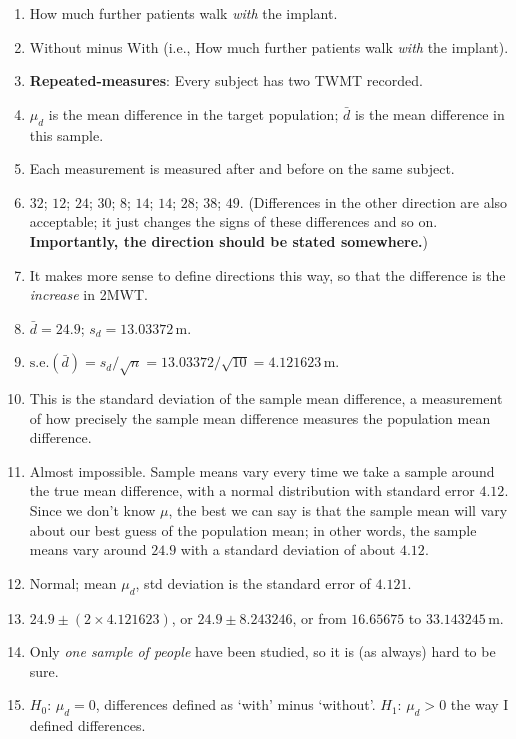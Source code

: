 \documentclass[
  11pt,
  a4paper,
  krantz2]{krantz}
\providecommand{\tightlist}{%
  \setlength{\itemsep}{0pt}\setlength{\parskip}{0pt}}
\begin{document}
\begin{footnotesize}
\begin{enumerate}
\def\labelenumi{\arabic{enumi}.}
\tightlist
\item
  How much further patients walk \emph{with} the implant.
\item
  Without minus With (i.e., How much further patients walk \emph{with} the implant).
\item
  \textbf{Repeated-measures}:
  Every subject has two TWMT recorded.
\item
  \(\mu_d\) is the mean difference in the target population; \(\bar{d}\) is the mean difference in this sample.
\item
  Each measurement is measured after and before on the same subject.
\item
  \(32\); \(12\); \(24\); \(30\); \(8\); \(14\); \(14\); \(28\); \(38\); \(49\).
  (Differences in the other direction are also acceptable; it just changes the signs of these differences and so on.
  \textbf{Importantly, the direction should be stated somewhere.})
\item
  It makes more sense to define directions this way, so that the difference is the \emph{increase} in 2MWT.
\item
  \(\bar{d} = 24.9\); \(s_d=13.03372\,\text{m}\).
\item
  \(\text{s.e.}(\bar{d}) = s_d/\sqrt{n} = 13.03372/\sqrt{10} = 4.121623\,\text{m}\).
\item
  This is the standard deviation of the sample mean difference, a measurement of how precisely the sample mean difference measures the population mean difference.
\item
  Almost impossible.
  Sample means vary every time we take a sample around the true mean difference, with a normal distribution with standard error \(4.12\).
  Since we don't know \(\mu\), the best we can say is that the sample mean will vary about our best guess of the population mean; in other words, the sample means vary around \(24.9\) with a standard deviation of about \(4.12\).
\item
  Normal; mean \(\mu_d\), std deviation is the standard error of \(4.121\).
\item
  \(24.9\pm (2\times 4.121623)\), or \(24.9\pm 8.243246\), or from \(16.65675\) to \(33.143245\,\text{m}\).
\item
  Only \emph{one sample of people} have been studied, so it is (as always) hard to be sure.
\item
  \(H_0\): \(\mu_d = 0\), differences defined as `with' minus `without'.
  \(H_1\): \(\mu_d > 0\) the way I defined differences.\\

\end{enumerate}
\end{footnotesize}
\end{document}
